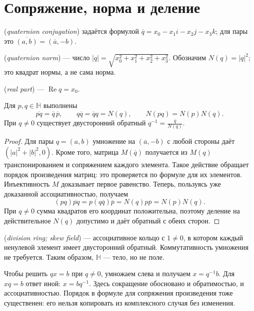 \section{Сопряжение, норма и деление}
\begin{definition}
 (\emph{quaternion conjugation}) задаётся формулой \(\overline q=x_0-x_1i-x_2j-x_3k\); для пары это \(\overline{(a,b)}=(\overline a,-b)\).
\end{definition}
\begin{definition}
 (\emph{quaternion norm}) — число \(|q|=\sqrt{x_0^2+x_1^2+x_2^2+x_3^2}\). Обозначим \(N(q)=|q|^2\); это квадрат нормы, а не сама норма.
\end{definition}
\begin{definition}
 (\emph{real part}) — \(\operatorname{Re}q=x_0\).
\end{definition}
\begin{theorem}\label{thm:legacy-c24-2}
Для \(p,q\in\mathbb H\) выполнены
\[
\overline{pq}=\overline q\,\overline p,\qquad
q\overline q=\overline q q=N(q),\qquad N(pq)=N(p)N(q).
\]
При \(q\ne0\) существует двусторонний обратный \(q^{-1}=\frac{\overline q}{N(q)}\).
\end{theorem}
\begin{proof}
Для пары \(q=(a,b)\) умножение на \((\overline a,-b)\) с любой стороны даёт \((|a|^2+|b|^2,0)\). Кроме того, матрица \(M(\overline q)\) получается из \(M(q)\) транспонированием и сопряжением каждого элемента. Такое действие обращает порядок произведения матриц: это проверяется по формуле для их элементов. Инъективность \(M\) доказывает первое равенство. Теперь, пользуясь уже доказанной ассоциативностью, получаем
\[
(pq)\overline{pq}=p(q\overline q)\overline p=N(q)p\overline p=N(p)N(q).
\]
При \(q\ne0\) сумма квадратов его координат положительна, поэтому деление на действительное \(N(q)\) допустимо и даёт обратный с обеих сторон.
\end{proof}
\begin{definition}
 (\emph{division ring; skew field}) — ассоциативное кольцо с \(1\ne0\), в котором каждый ненулевой элемент имеет двусторонний обратный. Коммутативность умножения не требуется. Таким образом, \(\mathbb H\) — тело, но не поле.
\end{definition}
Чтобы решить \(qx=b\) при \(q\ne0\), умножаем слева и получаем \(x=q^{-1}b\). Для \(xq=b\) ответ иной: \(x=bq^{-1}\). Здесь сокращение обосновано и обратимостью, и ассоциативностью. Порядок в формуле для сопряжения произведения тоже существенен: его нельзя копировать из комплексного случая без изменения.

